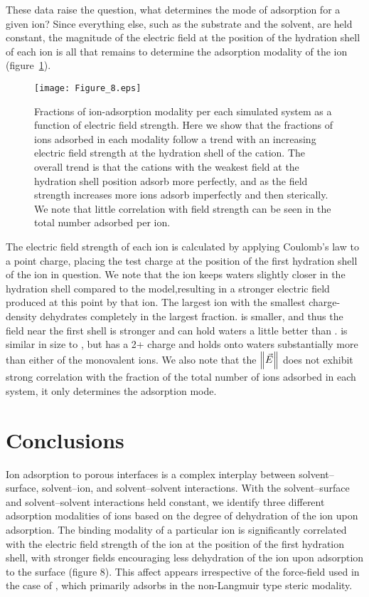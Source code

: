 These data raise the question, what determines the mode of adsorption for a given ion? Since everything else, such as
the substrate and the solvent, are held constant, the magnitude of the electric field at the position of the hydration shell
of each ion is all that remains to determine the adsorption modality of the ion (figure~\ref{figch3:cationfrac}).
\begin{figure}[h!tb]
    \caption[Fractions of ion-adsorption modalities]{Fractions of ion-adsorption modality per each simulated system as a function of electric field strength. Here we 
    show that the fractions of ions adsorbed in each modality follow a trend with an increasing electric field strength at the
    hydration shell of the cation. The overall trend is that the cations with the weakest field at the hydration shell position
    adsorb more perfectly, and as the field strength increases more ions adsorb imperfectly and then sterically. We note
    that little correlation with field strength can be seen in the total number adsorbed per ion.}
    \label{figch3:cationfrac}
    \texttt{[image: Figure\_8.eps]}
\end{figure}
The electric field strength of each ion is calculated by applying Coulomb's law to a point charge, placing the test charge at the 
position of the first hydration shell of the ion in question. We note that the \mgmbnbfix ion keeps waters slightly closer in the hydration shell
compared to the \mgmicro model{,}{resulting in} a stronger electric field 
produced at this point by that ion.
The largest ion with the smallest charge-density \na dehydrates completely in the largest fraction. \li{} is smaller, and thus the field near
the first shell is stronger and can hold waters a little better than \na. \mg is similar in size to \li{}, but has a 2+ charge and
holds onto waters substantially more than either of the monovalent ions.  
We also note that the $\left\lVert\vec{E}\right\rVert$ does not exhibit strong correlation with the fraction of the total number of ions adsorbed in each system, it
only determines the adsorption mode. 

\section{Conclusions}
Ion adsorption to porous interfaces is a complex interplay 
between solvent--surface, solvent--ion, and solvent--solvent
interactions. With the solvent--surface and solvent--solvent interactions 
held constant, we identify
three different adsorption modalities of ions based on the degree of 
dehydration of the ion upon adsorption. 
The binding modality of a particular ion is significantly correlated 
with the electric field strength of the ion
at the position of the first hydration shell, with stronger fields 
encouraging less dehydration of the ion upon
adsorption to the surface {(figure 8)}. This affect appears irrespective of the force-field 
used in the case
of \mg, which primarily adsorbs in the non-Langmuir type steric modality.


